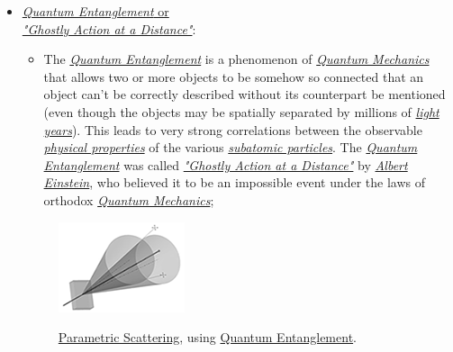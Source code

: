 \documentclass[conference]{IEEEtran}
\begin{document}
\begin{itemize}
  \item \href{https://en.wikipedia.org/wiki/Quantum_entanglement}{\textit{Quantum Entanglement} or \\\textit{"Ghostly Action at a Distance"}}:
   
    \begin{itemize}
        \item The \href{https://en.wikipedia.org/wiki/Quantum_entanglement}{\textit{Quantum Entanglement}} is a phenomenon of \href{https://en.wikipedia.org/wiki/Quantum_mechanics}{\textit{Quantum Mechanics}} that allows two or more objects to be somehow so connected that an object can't be correctly described without its counterpart be mentioned (even though the objects may be spatially separated by millions of \href{https://en.wikipedia.org/wiki/Light-year}{\textit{light years}}). This leads to very strong correlations between the observable \href{https://en.wikipedia.org/wiki/Physical_property}{\textit{physical properties}} of the various \href{https://en.wikipedia.org/wiki/Subatomic_particle}{\textit{subatomic particles}}. The \href{https://en.wikipedia.org/wiki/Quantum_entanglement}{\textit{Quantum Entanglement}} was called \href{https://en.wikipedia.org/wiki/Quantum_entanglement}{\textit{"Ghostly Action at a Distance"}} by \href{https://en.wikipedia.org/wiki/Albert_Einstein}{\textit{Albert Einstein}}, who believed it to be an impossible event under the laws of orthodox \href{https://en.wikipedia.org/wiki/Quantum_mechanics}{\textit{Quantum Mechanics}};
    \end{itemize}
    \begin{center}
      \begin{figure}[htbp]
        \centerline{\href{https://en.wikipedia.org/wiki/Quantum_entanglement}{\includegraphics{imgs/fig-4.png}}}
        \caption{\href{https://en.wikipedia.org/wiki/Spontaneous_parametric_down-conversion}{Parametric Scattering}, using \href{https://en.wikipedia.org/wiki/Quantum_entanglement}{Quantum Entanglement}.}
        \label{fig}
      \end{figure}
  \end{center}
\end{itemize}
\end{document}
